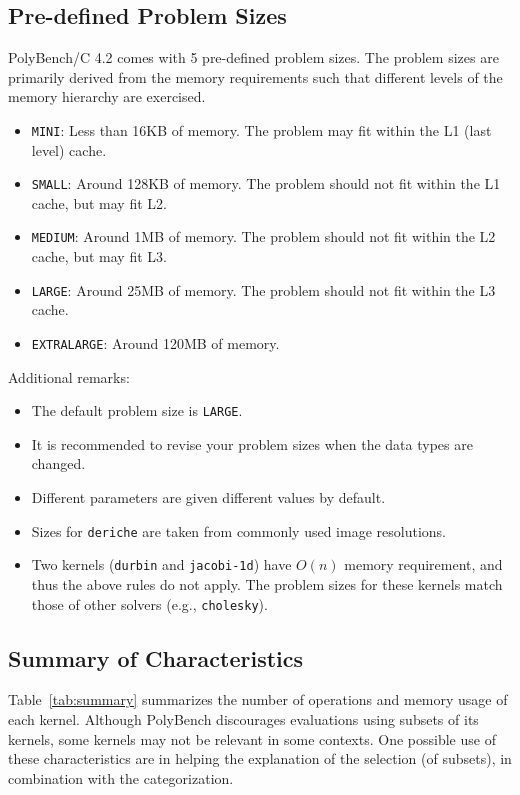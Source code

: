 \documentclass{article}
\newcommand\polybenchversion{4.2\xspace}
\begin{document}
\subsection*{Pre-defined Problem Sizes}
PolyBench/C \polybenchversion comes with 5 pre-defined problem sizes. The problem sizes are
primarily derived from the memory requirements such that different levels of
the memory hierarchy are exercised.

\begin{itemize}
\item {\tt MINI}: Less than 16KB of memory. The problem may fit within the L1 (last level) cache.
\item {\tt SMALL}: Around 128KB of memory. The problem should not fit within the L1 cache, but may fit L2.
\item {\tt MEDIUM}: Around 1MB of memory. The problem should not fit within the L2 cache, but may fit L3.
\item {\tt LARGE}: Around 25MB of memory. The problem should not fit within the L3 cache.
\item {\tt EXTRALARGE}: Around 120MB of memory. 
\end{itemize}

Additional remarks:
\begin{itemize}
\item The default problem size is {\tt LARGE}.
\item It is  recommended to revise your problem sizes when the data types are changed.
\item Different parameters are given different values by default.
\item Sizes for {\tt deriche} are taken from commonly used image resolutions.
\item Two kernels ({\tt durbin} and {\tt jacobi-1d}) have $O(n)$ memory requirement, and thus the above rules do not apply.
The problem sizes for these kernels match those of other solvers (e.g., {\tt cholesky}).
\end{itemize}

\subsection*{Summary of Characteristics}
Table~\ref{tab:summary} summarizes the number of operations and memory usage of
each kernel. Although PolyBench discourages evaluations using subsets of its
kernels, some kernels may not be relevant in some contexts. One possible use of
these characteristics are in helping the explanation of the selection (of
subsets), in combination with the categorization.
\end{document}

